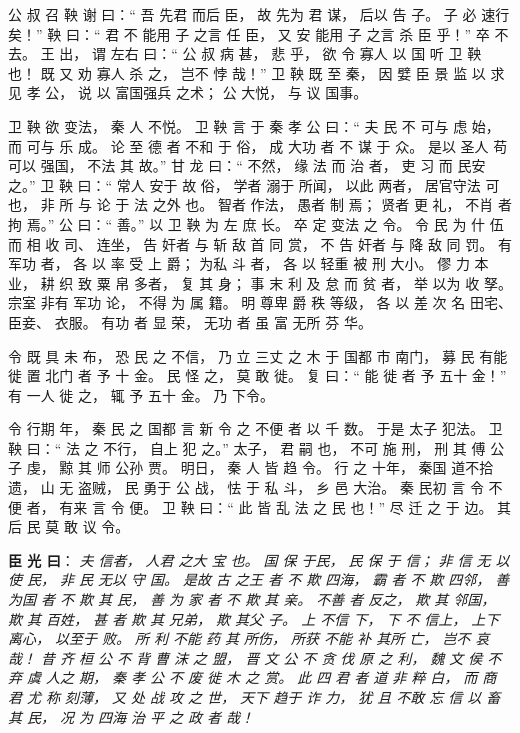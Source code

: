 \documentclass[UTF8,a4paper,8pt]{ctexbook}
\begin{document}
				公 叔 召 鞅 谢 曰：“ 吾 先君 而后 臣， 故 先为 君 谋， 后以 告 子。 子 必 速行 矣！” 鞅 曰：“ 君 不 能用 子 之言 任 臣， 又 安 能用 子 之言 杀 臣 乎！” 卒 不去。 王 出， 谓 左右 曰：“ 公 叔 病 甚， 悲 乎， 欲 令 寡人 以 国 听 卫 鞅 也！ 既 又 劝 寡人 杀 之， 岂不 悖 哉！” 卫 鞅 既 至 秦， 因 嬖 臣 景 监 以 求见 孝 公， 说 以 富国强兵 之术； 公 大悦， 与 议 国事。
								
				卫 鞅 欲 变法， 秦 人 不悦。 卫 鞅 言 于 秦 孝 公 曰：“ 夫 民 不 可与 虑 始， 而 可与 乐 成。 论 至 德 者 不和 于 俗， 成 大功 者 不 谋 于 众。 是以 圣人 苟 可以 强国， 不法 其 故。” 甘 龙 曰：“ 不然， 缘 法 而 治 者， 吏 习 而 民安 之。” 卫 鞅 曰：“ 常人 安于 故 俗， 学者 溺于 所闻， 以此 两者， 居官守法 可 也， 非 所 与 论 于 法 之外 也。 智者 作法， 愚者 制 焉； 贤者 更 礼， 不肖 者 拘 焉。” 公 曰：“ 善。” 以 卫 鞅 为 左 庶 长。 卒 定 变法 之 令。 令 民 为 什 伍 而 相 收 司、 连坐， 告 奸者 与 斩 敌 首 同 赏， 不 告 奸者 与 降 敌 同 罚。 有 军功 者， 各 以 率 受 上 爵； 为私 斗 者， 各 以 轻重 被 刑 大小。 僇 力 本 业， 耕 织 致 粟 帛 多者， 复 其 身； 事 末 利 及 怠 而 贫 者， 举 以为 收 孥。 宗室 非有 军功 论， 不得 为 属 籍。 明 尊卑 爵 秩 等级， 各 以 差 次 名 田宅、 臣妾、 衣服。 有功 者 显 荣， 无功 者 虽 富 无所 芬 华。 
				
				令 既 具 未 布， 恐 民 之 不信， 乃 立 三丈 之 木 于 国都 市 南门， 募 民 有能 徙 置 北门 者 予 十 金。 民 怪 之， 莫 敢 徙。 复 曰：“ 能 徙 者 予 五十 金！” 有 一人 徙 之， 辄 予 五十 金。 乃 下令。 
				
				令 行期 年， 秦 民 之 国都 言 新 令 之 不便 者 以 千 数。 于是 太子 犯法。 卫 鞅 曰：“ 法 之 不行， 自上 犯 之。” 太子， 君 嗣 也， 不可 施 刑， 刑 其 傅 公子 虔， 黥 其 师 公孙 贾。 明日， 秦 人 皆 趋 令。 行 之 十年， 秦国 道不拾遗， 山 无 盗贼， 民 勇于 公 战， 怯 于 私 斗， 乡 邑 大治。 秦 民初 言 令 不便 者， 有来 言 令 便。 卫 鞅 曰：“ 此 皆 乱 法 之 民 也！” 尽 迁 之 于 边。 其后 民 莫 敢 议 令。 
				
				\textbf{臣 光 曰}： \textit{夫 信者， 人君 之大 宝 也。 国 保 于民， 民 保 于 信； 非 信 无 以使 民， 非 民 无以 守 国。 是故 古 之王 者 不 欺 四海， 霸 者 不 欺 四邻， 善 为国 者 不 欺 其 民， 善 为 家 者 不 欺 其 亲。 不善 者 反之， 欺 其 邻国， 欺 其 百姓， 甚 者 欺 其 兄弟， 欺 其父 子。 上 不信 下， 下 不 信上， 上下 离心， 以至于 败。 所 利 不能 药 其 所伤， 所获 不能 补 其所 亡， 岂不 哀哉！ 昔 齐 桓 公 不 背 曹 沫 之 盟， 晋 文 公 不 贪 伐 原 之 利， 魏 文 侯 不弃 虞 人之 期， 秦 孝 公 不 废 徙 木 之 赏。 此 四 君 者 道 非 粹 白， 而 商 君 尤 称 刻薄， 又 处 战 攻 之 世， 天下 趋于 诈 力， 犹 且 不敢 忘 信 以 畜 其 民， 况 为 四海 治 平 之 政 者 哉！}
 
\end{document}
